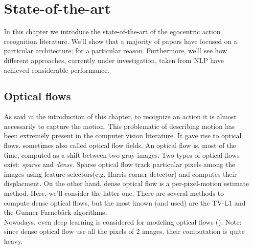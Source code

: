 \documentclass[12pt, a4paper]{report}
\begin{document}
		\section{State-of-the-art}\label{stateoftheart}
			In this chapter we introduce the state-of-the-art of the egocentric action recognition literature.
			We'll show that a majority of papers have focused on a particular architecture; for a particular reason.
			Furthermore, we'll see how different approaches, currently under investigation, taken from NLP have achieved considerable performance.

			\subsection{Optical flows}\label{optf}
				As said in the introduction of this chapter, to recognize an action it is almost necessarily to capture the motion.
				This problematic of describing motion has been extremely present in the computer vision literature.
				It gave rise to optical flows, sometimes also called optical flow fields.
				An optical flow is, most of the time, computed as a shift between two gray images.
				Two types of optical flows exist: {\itshape sparse} and {\itshape dense}.
				Sparse optical flow track particular pixels among the images using feature selectors(e.g. Harris corner detector) and computes their displacment.
				On the other hand, dense optical flow is a per-pixel-motion estimate method.
				Here, we'll consider the latter one.
				There are several methods to compute dense optical flows, but the most known (and used) are the TV-L1 \cite{sanchez} and the Gunner Farnebäck \cite{farneback} algorithms.\\  %
				Nowadays, even deep learning is considered for modeling optical flows (\cite{hur}).
				Note: since dense optical flow use all the pixels of 2 images, their computation is quite heavy.\\
			
\end{document}
